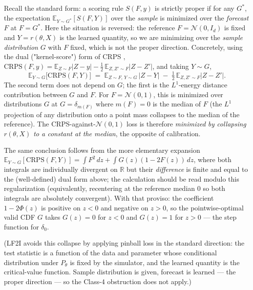 \documentclass[11pt]{article}
\begin{document}
Recall the standard form: a scoring rule \(S(F, y)\) is strictly proper
if for any \(G^*\), the expectation \(\mathbb{E}_{Y \sim G^*}[S(F, Y)]\)
over the \emph{sample} is minimized over the \emph{forecast} \(F\) at
\(F = G^*\). Here the situation is reversed: the reference
\(F = \mathcal{N}(0, I_d)\) is fixed and \(Y = r(\theta, X)\) is the
learned quantity, so we are minimizing over the \emph{sample
distribution} \(G\) with \(F\) fixed, which is not the proper
direction. Concretely, using the dual ("kernel-score") form of
CRPS \citep{GneitingRaftery2007},
\(\mathrm{CRPS}(F, y) = \mathbb{E}_{Z \sim F}|Z - y| - \tfrac{1}{2}\,\mathbb{E}_{Z, Z' \sim F}|Z - Z'|\),
and taking \(Y \sim G\),
\[
\mathbb{E}_{Y \sim G}\bigl[\mathrm{CRPS}(F, Y)\bigr] \;=\; \mathbb{E}_{Z \sim F,\, Y \sim G}\,|Z - Y| \;-\; \tfrac{1}{2}\,\mathbb{E}_{Z, Z' \sim F}|Z - Z'|.
\]
The second term does not depend on \(G\); the first is the
\(L^1\)-energy distance contribution between \(G\) and \(F\). For
\(F = \mathcal{N}(0,1)\), this is minimized over distributions \(G\) at
\(G = \delta_{m(F)}\) where \(m(F) = 0\) is the median of \(F\) (the
\(L^1\) projection of any distribution onto a point mass collapses to
the median of the reference). The CRPS-against-\(\mathcal{N}(0,1)\)
loss is therefore \emph{minimized by collapsing \(r(\theta, X)\) to a
constant at the median}, the opposite of calibration.

The same conclusion follows from the more elementary expansion
\(\mathbb{E}_{Y \sim G}[\mathrm{CRPS}(F, Y)] = \int F^2\,dz + \int G(z)(1-2F(z))\,dz\),
where both integrals are individually divergent on \(\mathbb{R}\) but
their \emph{difference} is finite and equal to the (well-defined) dual
form above; the calculation should be read modulo this regularization
(equivalently, recentering at the reference median \(0\) so both
integrals are absolutely convergent). With that proviso: the
coefficient \(1 - 2\Phi(z)\) is positive on \(z < 0\) and negative on
\(z > 0\), so the pointwise-optimal valid CDF \(G\) takes \(G(z) = 0\)
for \(z < 0\) and \(G(z) = 1\) for \(z > 0\) --- the step function for
\(\delta_0\).

(LF2I \citep{DalmassoEtAl2024} avoids this collapse by applying pinball
loss in the standard direction: the test statistic is a function of the
data and parameter whose conditional distribution under \(P_\theta\) is
fixed by the simulator, and the learned quantity is the critical-value
function. Sample distribution is given, forecast is learned --- the
proper direction --- so the Class-4 obstruction does not apply.)
\end{document}
